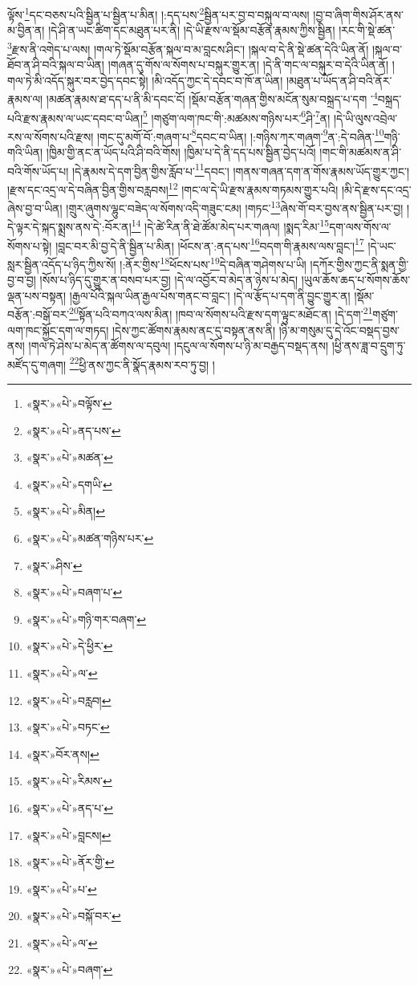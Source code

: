 ལྟོས་\footnote{«སྣར་»«པེ་»བལྟོས་}དང་བཅས་པའི་སྦྱིན་པ་སྦྱིན་པ་མིན། །:དད་པས་\footnote{«སྣར་»«པེ་»ནད་པས་}སྦྱིན་པར་བྱ་བ་བསྐུལ་བ་ལས། །བྱ་བ་ཞིག་གིས་ཤོར་ནས་མ་བྱིན་ན། །དེ་ཤི་ན་ཡང་ཚིག་དང་མཐུན་པར་ནི། །དེ་ཡི་རྫས་ལ་སྡོམ་བརྩོན་རྣམས་ཀྱིས་སྦྱིན། །རང་གི་སྡེ་ཚན་\footnote{«སྣར་»«པེ་»མཚན་}རྫས་ནི་འགེད་པ་ལས། །གལ་ཏེ་སྡོམ་བརྩོན་སྐལ་བ་མ་བླངས་ཤིང་། །སྐལ་བ་དེ་ནི་སྡེ་ཚན་དེའི་ཡིན་ནོ། །སྐལ་བ་ཐོབ་ན་ཤི་བའི་སྐལ་བ་ཡིན། །གཞན་དུ་གོས་ལ་སོགས་པ་བསྐུར་གྱུར་ན། །དེ་ནི་གང་ལ་བསྐུར་བ་དེའི་ཡིན་ནོ། །གལ་ཏེ་མི་འདོད་སྐུར་བར་བྱེད་དབང་སྟེ། །མི་འདོད་ཀྱང་དེ་དབང་བ་ཁོ་ན་ཡིན། །མཐུན་པ་ཡོད་ན་ཤི་བའི་ནོར་རྣམས་ལ། །མཚན་རྣམས་ཐ་དད་པ་ནི་མི་དབང་ངོ། །སྡོམ་བརྩོན་གཞན་གྱིས་མངོན་སུམ་བསྐྲད་པ་དག ་\footnote{«སྣར་»«པེ་»དགཡི་}བསྐྲད་པའི་རྫས་རྣམས་ལ་ཡང་དབང་བ་ཡིན།\footnote{«སྣར་»«པེ་»མིན།} །གཙུག་ལག་ཁང་གི་:མཚམས་གཉིས་པར་\footnote{«སྣར་»«པེ་»མཚན་གཉིས་པར་}ཤི་\footnote{«སྣར་»ཤིས་}ན། །དེ་ཡི་ལུས་འབྲེལ་རས་ལ་སོགས་པའི་རྫས། །གང་དུ་མགོ་བོ་:གཞག་པ་\footnote{«སྣར་»«པེ་»བཞག་པ་}དབང་བ་ཡིན། །:གཉིས་ཀར་གཞག་\footnote{«སྣར་»«པེ་»གཉི་གར་བཞག་}ན་:དེ་བཞིན་\footnote{«སྣར་»«པེ་»དེ་ཕྱིར་}གཉི་གའི་ཡིན། །ཁྱིམ་གྱི་ནང་ན་ཡོད་པའི་ཤི་བའི་གོས། །ཁྱིམ་པ་དེ་ནི་དད་པས་སྦྱིན་བྱེད་པའོ། །གང་གི་མཚམས་ན་ཤི་བའི་གོས་ཡོད་པ། །དེ་རྣམས་དེ་དག་བྱིན་གྱིས་རློབ་པ་\footnote{«སྣར་»«པེ་»ལ་}དབང་། །གནས་གཞན་དག་ན་གོས་རྣམས་ཡོད་གྱུར་ཀྱང་། །རྫས་དང་འདྲ་ལ་དེ་བཞིན་བྱིན་གྱིས་བརླབས།\footnote{«སྣར་»«པེ་»བརླབ།} །གང་ལ་དེ་ཡི་རྫས་རྣམས་གཏམས་གྱུར་པའི། །མི་དེ་རྫས་དང་འདྲ་ཞེས་བྱ་བ་ཡིན། །གྲུར་ཞུགས་ལྷུང་བཟེད་ལ་སོགས་འདི་གཟུང་ངམ། །གཏང་\footnote{«སྣར་»«པེ་»བཏང་}ཞེས་གོ་བར་བྱས་ནས་སྦྱིན་པར་བྱ། །དེ་ལྟར་དེ་སྐད་སྨྲས་ནས་དེ་:བོར་ན།\footnote{«སྣར་»བོར་ནས།} །དེ་ཚེ་རིན་ནི་ཐེ་ཚོམ་མེད་པར་གཞལ། །སྨད་རིམ་\footnote{«སྣར་»«པེ་»རིམས་}དག་ལས་གོས་ལ་སོགས་པ་སྟེ། །བླང་བར་མི་བྱ་དེ་ནི་སྦྱིན་པ་མིན། །ཕོངས་ན་:ནད་པས་\footnote{«སྣར་»«པེ་»ནད་པ་}བདག་གི་རྣམས་ལས་བླང་།\footnote{«སྣར་»«པེ་»བླངས།} །དེ་ཡང་སླར་སྦྱིན་འདོད་པ་ཉིད་ཀྱིས་སོ། །:ནོར་གྱིས་\footnote{«སྣར་»«པེ་»ནོར་གྱི་}ཕོངས་པས་\footnote{«སྣར་»«པེ་»པ་}དེ་བཞིན་གཤེགས་པ་ཡི། །དཀོར་གྱིས་ཀྱང་ནི་སྨན་གྱི་བྱ་བ་བྱ། །སོས་པ་ཉིད་དུ་གྱུར་ན་བསབ་པར་བྱ། །དེ་ལ་འབྱོར་བ་མེད་ན་ཉེས་པ་མེད། །ཡུལ་ཆོས་ཆད་པ་སོགས་ཆོས་ལྡན་པས་བསྟན། །རྒྱལ་པོའི་སྐལ་ཡིན་རྒྱལ་པོས་གནང་བ་བླང་། །དེ་ལ་རྩོད་པ་དག་ནི་བྱུང་གྱུར་ན། །སྡོམ་བརྩོན་:བསྒོ་བར་\footnote{«སྣར་»«པེ་»བསྐོ་བར་}སྟོན་པའི་བཀའ་ལས་མིན། །ཁབ་ལ་སོགས་པའི་རྫས་དག་ལྟུང་མཐོང་ན། །དེ་དག་\footnote{«སྣར་»«པེ་»ལ་}གཙུག་ལག་ཁང་སྐྱོང་དག་ལ་གཏད། །དེས་ཀྱང་ཚོགས་རྣམས་ནང་དུ་བསྟན་ནས་ནི། །ཉི་མ་གསུམ་དུ་དེ་འོང་བསྡད་བྱས་ནས། །གལ་ཏེ་ཤེས་པ་མེད་ན་ཚོགས་ལ་དབུལ། །དངུལ་ལ་སོགས་པ་ཉི་མ་བརྒྱད་བསྡད་ནས། །ཕྱི་ནས་ཟླ་བ་དྲུག་ཏུ་མཛོད་དུ་གཞག། \footnote{«སྣར་»«པེ་»བཞག་}ཕྱི་ནས་ཀྱང་ནི་སྣོད་རྣམས་རབ་ཏུ་བྱ། །
